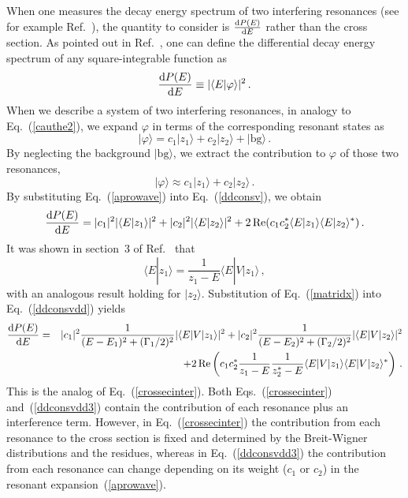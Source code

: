 \documentclass[12pt]{article}
\newcommand{\rmd}{{\rm d}}
\begin{document}
When one measures the decay energy spectrum of two 
interfering resonances (see for example Ref.~\cite{BESIII2}),
the quantity to consider is $\frac{\rmd P (E)}{\rmd E}$ rather than
the cross section. As pointed out
in Ref.~\cite{NPA15}, one can define the differential decay energy spectrum of
any square-integrable function as
\begin{equation}
       \frac{\rmd P(E)}{\rmd E} \equiv |\langle E|\varphi \rangle |^2 \, .
      \label{ddconsv}
\end{equation}
When we describe a system of two interfering resonances, in analogy 
to Eq.~(\ref{cauthe2}), we
expand $\varphi$ in terms of the corresponding resonant states as
\begin{equation}
 |\varphi \rangle = c_1 |z_1\rangle + c_2 |z_2\rangle + |\text{bg}\rangle \, .
\end{equation}
By neglecting the background $|\text{bg}\rangle$, we extract the 
contribution to $\varphi$ of those two resonances,
\begin{equation}
 |\varphi \rangle \approx c_1 |z_1\rangle + c_2 |z_2\rangle \, .
     \label{aprowave}
\end{equation}
By substituting Eq.~(\ref{aprowave}) into Eq.~(\ref{ddconsv}), 
we obtain
\begin{equation}
       \frac{\rmd P(E)}{\rmd E} = |c_1|^2 |\langle E|z_1 \rangle |^2 +
   |c_2|^2 |\langle E|z_2 \rangle |^2 + 2 \, \text{Re} (c_1c_2^*
   \langle E|z_1 \rangle \langle E|z_2 \rangle ^*) \, .
      \label{ddconsvdd}
\end{equation}
It was shown in section~3 of Ref.~\cite{NPA15} that
\begin{equation}
       \langle E|z_1 \rangle = \frac{1}{z_1-E} \langle E|V|z_1\rangle \, ,
       \label{matridx}
\end{equation}
with an analogous result holding for $|z_2\rangle$. Substitution
of Eq.~(\ref{matridx}) into Eq.~(\ref{ddconsvdd}) yields
\begin{eqnarray}
       \frac{\rmd P(E)}{\rmd E} &=& |c_1|^2 
        \frac{1}{(E-E_1)^2+(\Gamma _1/2)^2}|\langle E|V|z_1 \rangle |^2+
   |c_2|^2 \frac{1}{(E-E_2)^2+(\Gamma _2/2)^2}|\langle E|V|z_2 \rangle |^2
        \nonumber \\
   && + 2 \, \text{Re} \left( c_1c_2^* \frac{1}{z_1-E}\frac{1}{z_2^*-E}
        \langle E|V|z_1 \rangle \langle E|V|z_2 \rangle ^* \right) \, .
      \label{ddconsvdd3}
\end{eqnarray}
This is the analog of Eq.~(\ref{crossecinter}). Both 
Eqs.~(\ref{crossecinter}) and~(\ref{ddconsvdd3}) contain the
contribution of each resonance plus an interference term. However,
in Eq.~(\ref{crossecinter}) the contribution from each resonance to 
the cross section is fixed and determined by the Breit-Wigner
distributions and the residues, whereas in Eq.~(\ref{ddconsvdd3}) the
contribution from each resonance can change depending on its weight ($c_1$ or
$c_2$) in the resonant expansion~(\ref{aprowave}).
\end{document}
